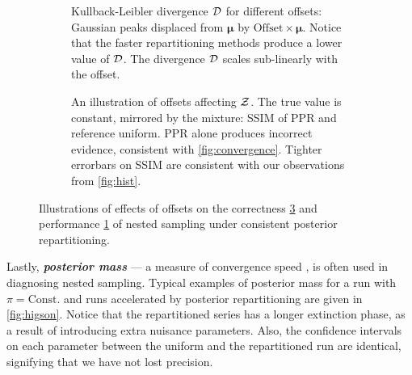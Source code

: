 \documentclass[usenatbib]{mnras}
\begin{document}
\begin{figure} \centering
  \begin{subfigure}{0.99\columnwidth}
    \centering

    
    \caption{Kullback-Leibler divergence \({\cal D}\) for different
      offsets: Gaussian peaks displaced from \(\bm{\mu}\) by
      \(\text{Offset}\times \bm{\mu}\). Notice that the faster
      repartitioning methods produce a lower value of \({\cal
        D}\). The divergence \({\cal D}\) scales sub-linearly with the
      offset.\label{fig:kl-d}}
\end{subfigure}

\begin{subfigure}{0.99\columnwidth}
  \centering

  
  
  \caption{An illustration of offsets affecting ${\cal Z}$. The true
    value is constant, mirrored by the mixture: SSIM of PPR and
    reference uniform. PPR alone produces incorrect evidence,
    consistent with \cref{fig:convergence}. Tighter errorbars on SSIM
    are consistent with our observations from
    \cref{fig:hist}.\label{fig:drift}}
\end{subfigure}
\caption{Illustrations of effects of offsets on the correctness
  \ref{fig:drift} and performance \ref{fig:kl-d} of nested sampling
  under consistent posterior repartitioning.}
\end{figure}



Lastly, \textbf{\emph{posterior mass}} --- a measure of convergence
speed \citep{higson2018nestcheck}, is often used in diagnosing nested
sampling. Typical examples of posterior mass for a run with
$\pi=\text{Const.}$ and runs accelerated by posterior repartitioning
are given in \cref{fig:higson}. Notice that the repartitioned series
has a longer extinction phase, as a result of introducing extra
nuisance parameters. Also, the confidence intervals on each parameter
between the uniform and the repartitioned run are identical,
signifying that we have not lost precision.
\end{document}
